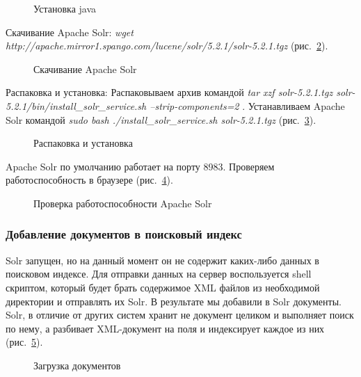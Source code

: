 \begin{figure}[h!]
\caption{Установка java}
\label{ship_12:ship_12}
\end{figure}

Скачивание Apache Solr:
\textit
{
wget http://apache.mirror1.spango.com/lucene/solr/5.2.1/solr-5.2.1.tgz
} (рис.~\ref{ship_13:ship_13}).

\begin{figure}[h!]
\caption{Скачивание Apache Solr}
\label{ship_13:ship_13}
\end{figure}

Распаковка и установка:
Распаковываем архив командой 
\textit
{
tar xzf solr-5.2.1.tgz solr-5.2.1/bin/install\_solr\_service.sh --strip-components=2
}.
Устанавливаем Apache Solr командой 
\textit
{
sudo bash ./install\_solr\_service.sh solr-5.2.1.tgz
} (рис.~\ref{ship_14:ship_14}).
\begin{figure}[h!]
\caption{Распаковка и установка}
\label{ship_14:ship_14}
\end{figure}

Apache Solr по умолчанию работает на порту 8983. Проверяем работоспособность в браузере (рис.~\ref{ship_15:ship_15}).

\begin{figure}[h!]
\caption{Проверка работоспособности Apache Solr}
\label{ship_15:ship_15}
\end{figure}

\subsubsection{Добавление документов в поисковый индекс}

Solr запущен, но на данный момент он не содержит каких-либо данных в поисковом индексе. 
Для отправки данных на сервер воспользуется shell скриптом, который будет брать содержимое XML файлов из необходимой директории и отправлять их Solr. В результате мы добавили в Solr документы. Solr, в отличие от других систем хранит не документ целиком и выполняет поиск по нему, а разбивает XML-документ на поля и индексирует каждое из них  (рис.~\ref{ship_16:ship_16}).

\begin{figure}[h!]
\caption{Загрузка документов}
\label{ship_16:ship_16}
\end{figure}

